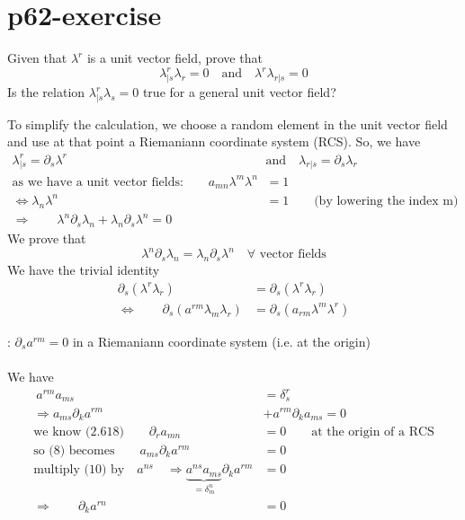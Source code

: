 \section{p62-exercise}
\begin{tcolorbox}
Given that $\lambda^r$ is a unit vector field, prove that $$\lambda^r_{|s}\lambda_r = 0 \quad \text{and}\quad \lambda^r\lambda_{r|s} = 0 $$
Is the relation $\lambda^r_{|s}\lambda_s = 0$ true for a general unit vector field?
\end{tcolorbox}
To simplify the calculation, we choose a random element in the unit vector field and use at that point a Riemaniann coordinate system (RCS). So, we have
\begin{align}
\lambda^r_{|s} = \partial_s \lambda^r \quad & \text{and}\quad \lambda_{r|s} = \partial_s \lambda_r\\
\text{as we have a unit vector fields:}\quad\quad a_{mn}\lambda^m\lambda^n &= 1\\
\Leftrightarrow \lambda_n\lambda^n &= 1\quad\quad\text{(by lowering the index m)}\\
\Rightarrow \quad\quad \lambda^n\partial_s \lambda_n + \lambda_n\partial_s \lambda^n = 0
\end{align}
We prove that $$\lambda^n\partial_s\lambda_n = \lambda_n\partial_s\lambda^n\quad \forall\text{ vector fields}$$
We have the trivial identity
\begin{align}
\partial_s(\lambda^r\lambda_r) &= \partial_s(\lambda^r\lambda_r)\\
\Leftrightarrow \quad\quad \partial_s(a^{rm}\lambda_m\lambda_r) &= \partial_s(a_{rm}\lambda^m\lambda^r)
\end{align}
\begin{lemma}: $\partial_sa^{rm} = 0$ in a Riemaniann coordinate system (i.e. at the origin)\\\\
We have
\begin{align}
\ a^{rm}a_{ms} &= \delta^r_s\\
\Rightarrow a_{ms}\partial_k a^{rm}  & +a^{rm}\partial_k a_{ms} = 0\\
\text{we know (2.618)}\quad\quad \partial_r a_{mn} &= 0\quad\quad\text{at the origin of a RCS}\\
\text{so (8) becomes}\quad\quad a_{ms}\partial_k a^{rm} & = 0\\
\text{multiply (10) by}\quad a^{ns}\quad\Rightarrow \underbrace{a^{ns}a_{ms}}_{= \delta^n_m}\partial_k a^{rm}& = 0\\
\Rightarrow\quad\quad \partial_k a^{rn}& = 0
\end{align}
\end{lemma}

